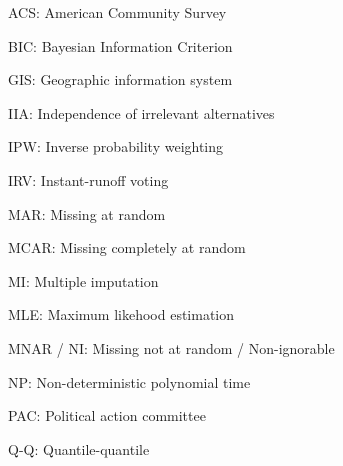 \documentclass[12pt,twoside]{reedthesis}
\begin{document}
  \begin{abbrevs}
    \noindent ACS: American Community Survey
    
    \par
    
    \noindent BIC: Bayesian Information Criterion
    
    \par
    
    \noindent GIS: Geographic information system
    
    \par
    
    \noindent IIA: Independence of irrelevant alternatives
    
    \par
    
    \noindent IPW: Inverse probability weighting
    
    \par
    
    \noindent IRV: Instant-runoff voting
    
    \par
    
    \noindent MAR: Missing at random
    
    \par
    
    \noindent MCAR: Missing completely at random
    
    \par
    
    \noindent MI: Multiple imputation
    
    \par
    
    \noindent MLE: Maximum likehood estimation
    
    \par
    
    \noindent MNAR / NI: Missing not at random / Non-ignorable
    
    \par
    
    \noindent NP: Non-deterministic polynomial time
    
    \par
    
    \noindent PAC: Political action committee
    
    \par
    
    \noindent Q-Q: Quantile-quantile
    
    \par
    

\end{abbrevs}
\end{document}
